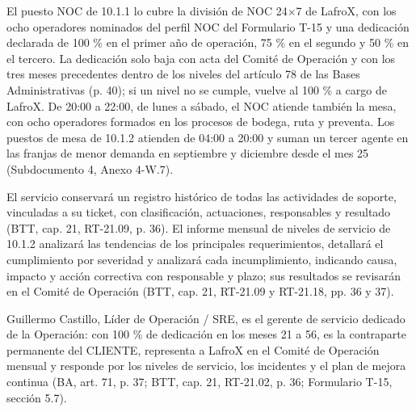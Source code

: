El puesto NOC de 10.1.1 lo cubre la división de NOC 24\ensuremath{\times}7 de LafroX, con los ocho operadores nominados del perfil NOC del Formulario T-15 y una dedicación declarada de 100 \% en el primer año de operación, 75 \% en el segundo y 50 \% en el tercero. La dedicación solo baja con acta del Comité de Operación y con los tres meses precedentes dentro de los niveles del artículo 78 de las Bases Administrativas (p. 40); si un nivel no se cumple, vuelve al 100 \% a cargo de LafroX. De 20:00 a 22:00, de lunes a sábado, el NOC atiende también la mesa, con ocho operadores formados en los procesos de bodega, ruta y preventa. Los puestos de mesa de 10.1.2 atienden de 04:00 a 20:00 y suman un tercer agente en las franjas de menor demanda en septiembre y diciembre desde el mes 25 (Subdocumento 4, Anexo 4-W.7).

El servicio conservará un registro histórico de todas las actividades de soporte, vinculadas a su ticket, con clasificación, actuaciones, responsables y resultado (BTT, cap. 21, RT-21.09, p. 36). El informe mensual de niveles de servicio de 10.1.2 analizará las tendencias de los principales requerimientos, detallará el cumplimiento por severidad y analizará cada incumplimiento, indicando causa, impacto y acción correctiva con responsable y plazo; sus resultados se revisarán en el Comité de Operación (BTT, cap. 21, RT-21.09 y RT-21.18, pp. 36 y 37).

Guillermo Castillo, Líder de Operación / SRE, es el gerente de servicio dedicado de la Operación: con 100 \% de dedicación en los meses 21 a 56, es la contraparte permanente del CLIENTE, representa a LafroX en el Comité de Operación mensual y responde por los niveles de servicio, los incidentes y el plan de mejora continua (BA, art. 71, p. 37; BTT, cap. 21, RT-21.02, p. 36; Formulario T-15, sección 5.7).

